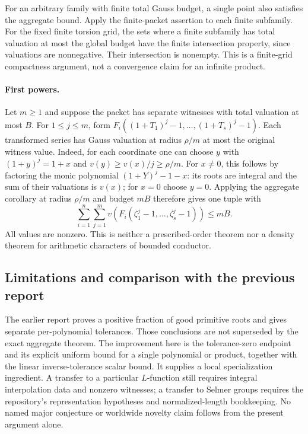 For an arbitrary family with finite total Gauss budget, a single point
also satisfies the aggregate bound.  Apply the finite-packet assertion
to each finite subfamily.  For the fixed finite torsion grid, the sets
where a finite subfamily has total valuation at most the global budget
have the finite intersection property, since valuations are nonnegative.
Their intersection is nonempty.  This is a finite-grid compactness
argument, not a convergence claim for an infinite product.

\paragraph{First powers.}
Let $m\geq1$ and suppose the packet has separate witnesses with total
valuation at most $B$.  For $1\leq j\leq m$, form
$F_i((1+T_1)^j-1,\ldots,(1+T_s)^j-1)$.
Each transformed series has Gauss valuation at radius $\rho/m$ at most
the original witness value.  Indeed, for each coordinate one can choose
$y$ with $(1+y)^j=1+x$ and $v(y)\geq v(x)/j\geq\rho/m$.
For $x\ne0$, this follows by factoring the monic polynomial
$(1+Y)^j-1-x$: its roots are integral and the sum of their valuations
is $v(x)$; for $x=0$ choose $y=0$.
Applying the aggregate corollary at radius $\rho/m$ and budget $mB$
therefore gives one tuple with
\[
 \sum_{i=1}^n\sum_{j=1}^m
 v(F_i(\zeta_1^j-1,\ldots,\zeta_s^j-1))\leq mB.
\]
All values are nonzero.  This is neither a prescribed-order theorem nor
a density theorem for arithmetic characters of bounded conductor.

\subsection{Limitations and comparison with the previous report}

The earlier report proves a positive fraction of good primitive roots
and gives separate per-polynomial tolerances.  Those conclusions are
not superseded by the exact aggregate theorem.  The improvement here is
the tolerance-zero endpoint and its explicit uniform bound for a single
polynomial or product, together with the linear inverse-tolerance scalar
bound.  It supplies a local specialization ingredient.  A transfer to a
particular $L$-function still requires integral interpolation data and
nonzero witnesses; a transfer to Selmer groups requires the repository's
representation hypotheses and normalized-length bookkeeping.  No named
major conjecture or worldwide novelty claim follows from the present
argument alone.
